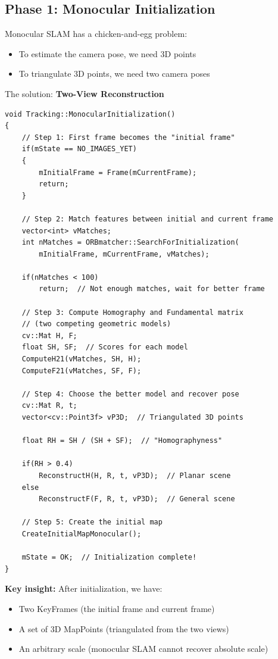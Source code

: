 \subsection{Phase 1: Monocular Initialization}

Monocular SLAM has a chicken-and-egg problem:
\begin{itemize}
    \item To estimate the camera pose, we need 3D points
    \item To triangulate 3D points, we need two camera poses
\end{itemize}

The solution: \textbf{Two-View Reconstruction}

\begin{lstlisting}[caption={MonocularInitialization simplified}]
void Tracking::MonocularInitialization()
{
    // Step 1: First frame becomes the "initial frame"
    if(mState == NO_IMAGES_YET)
    {
        mInitialFrame = Frame(mCurrentFrame);
        return;
    }
    
    // Step 2: Match features between initial and current frame
    vector<int> vMatches;
    int nMatches = ORBmatcher::SearchForInitialization(
        mInitialFrame, mCurrentFrame, vMatches);
    
    if(nMatches < 100)
        return;  // Not enough matches, wait for better frame
    
    // Step 3: Compute Homography and Fundamental matrix
    // (two competing geometric models)
    cv::Mat H, F;
    float SH, SF;  // Scores for each model
    ComputeH21(vMatches, SH, H);
    ComputeF21(vMatches, SF, F);
    
    // Step 4: Choose the better model and recover pose
    cv::Mat R, t;
    vector<cv::Point3f> vP3D;  // Triangulated 3D points
    
    float RH = SH / (SH + SF);  // "Homographyness"
    
    if(RH > 0.4)
        ReconstructH(H, R, t, vP3D);  // Planar scene
    else
        ReconstructF(F, R, t, vP3D);  // General scene
    
    // Step 5: Create the initial map
    CreateInitialMapMonocular();
    
    mState = OK;  // Initialization complete!
}
\end{lstlisting}

\textbf{Key insight:} After initialization, we have:
\begin{itemize}
    \item Two KeyFrames (the initial frame and current frame)
    \item A set of 3D MapPoints (triangulated from the two views)
    \item An arbitrary scale (monocular SLAM cannot recover absolute scale)
\end{itemize}

